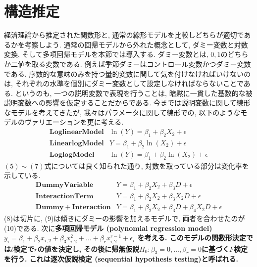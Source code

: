 \documentclass[paper=a4paper,fontsize=10pt]{jlreq}
\begin{document}
\section{構造推定}
経済理論から推定された関数形と, 通常の線形モデルを比較しどちらが適切であるかを考察しよう. 通常の回帰モデルから外れた概念として, ダミー変数と対数変換, そして多項回帰モデルを本節では導入する. ダミー変数とは, $0, 1$のどちらか二値を取る変数である. 例えば季節ダミーはコントロール変数かつダミー変数である. 序数的な意味のみを持つ量的変数に関して気を付けなければいけないのは, それぞれの水準を個別にダミー変数として設定しなければならないことである. というのも, 一つの説明変数で表現を行うことは, 暗黙に一貫した基数的な被説明変数への影響を仮定することだからである. 今までは説明変数に関して線形なモデルを考えてきたが, 我々はパラメータに関して線形での, 以下のようなモデルのヴァリエーションを更に考える.
\begin{align}
  \mathbf{Loglinear Model　}&\ln(Y)=\beta_1+\beta_2X_{2}+\epsilon\\
  \mathbf{Linearlog Model　}&Y=\beta_1+\beta_2\ln(X_{2})+\epsilon\\
  \mathbf{Loglog Model　}&\ln(Y)=\beta_1+\beta_2\ln(X_{2})+\epsilon
\end{align}
$(5) \sim (7)$式については良く知られた通り, 対数を取っている部分は変化率を示している.
\begin{align}
  \mathbf{Dummy Variable　}&Y=\beta_1+\beta_2X_{2}+\beta_3D+\epsilon\\
  \mathbf{Interaction Term　}&Y=\beta_1+\beta_2X_{2}+\beta_3X_{2}D+\epsilon\\
  \mathbf{Dummy+Interaction　}&Y=\beta_1+\beta_2X_{2}+\beta_3D+\beta_4X_{2}D+\epsilon
\end{align}
(8)は切片に, (9)は傾きにダミーの影響を加えるモデルで, 両者を合わせたのが(10)である. 次に\rmfamily\mcfamily\bfseries{多項回帰モデル (polynomial regression model)}\mdseries  $ y_i = \beta_1 + \beta_2 x_{i,2} + \beta_3 x_{i,2}^2 + \dots + \beta_r x_{i,2}^{r-1} + \epsilon_i$ を考える. このモデルの関数形決定では$t$検定で$r$の値を決定し, その後に帰無仮説$H_0 : \beta_3 = 0, \dots, \beta_r = 0$に基づく$F$検定を行う. これは逐次仮説検定 (sequential hypothesis testing)と呼ばれる.\\
\end{document}
